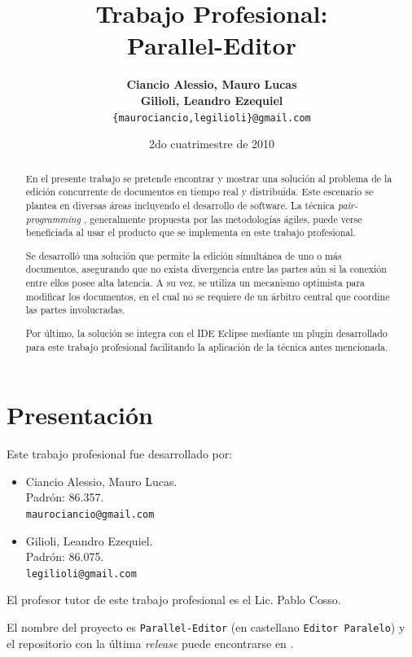 \documentclass[12pt,a4paper]{article}
\title { \textbf{Trabajo Profesional: \\ Parallel-Editor}}
\date{2do cuatrimestre de 2010}
\author{\textbf{Ciancio Alessio, Mauro Lucas} \\
		\textbf{Gilioli, Leandro Ezequiel}	  \\
		\texttt{\{maurociancio,legilioli\}@gmail.com}
	}
\let\stdsection\section
\renewcommand\section{\newpage\stdsection}
\begin{document}
\maketitle

\begin{abstract}
En el presente trabajo se pretende encontrar y mostrar una solución al problema de
la edición concurrente de documentos en tiempo real y distribuida. Este escenario se plantea en
diversas áreas incluyendo el desarrollo de software. La técnica \textit{pair-programming} \cite{pair-programming},
generalmente propuesta por las metodologías ágiles, puede verse beneficiada al usar 
el producto que se implementa en este trabajo profesional.

Se desarrolló una solución que permite la edición simultánea de uno o más documentos, asegurando
que no exista divergencia entre las partes aún si la conexión entre ellos posee alta latencia. A su vez,
se utiliza un mecanismo optimista para modificar los documentos, en el cual no se requiere de un árbitro
central que coordine las partes involucradas.

Por último, la solución se integra con el IDE Eclipse \cite{eclipse-ide} mediante un plugin desarrollado 
para este trabajo profesional facilitando la aplicación de la técnica antes mencionada.
\end{abstract}

\newpage
\tableofcontents
\newpage

\section{Presentación}

Este trabajo profesional fue desarrollado por:

	\begin{itemize}
		\item Ciancio Alessio, Mauro Lucas. \\
		      Padrón: 86.357. \\
		      \texttt{maurociancio@gmail.com}
		\item Gilioli, Leandro Ezequiel. \\
		      Padrón: 86.075. \\
   		      \texttt{legilioli@gmail.com}
	\end{itemize}

El profesor tutor de este trabajo profesional es el Lic. Pablo Cosso.

El nombre del proyecto es \texttt{Parallel-Editor} (en castellano \texttt{Editor Paralelo}) y el repositorio con la
última \textit{release} puede encontrarse en \cite{github}.
\end{document}
